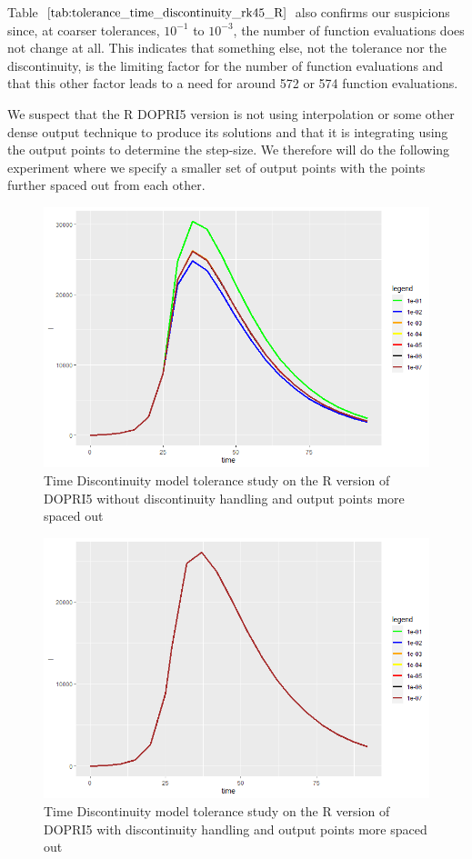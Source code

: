 Table $\ref{tab:tolerance_time_discontinuity_rk45_R}$ also confirms our suspicions since, at coarser tolerances, $10^{-1}$ to $10^{-3}$, the number of function evaluations does not change at all. This indicates that something else, not the tolerance nor the discontinuity, is the limiting factor for the number of function evaluations and that this other factor leads to a need for around 572 or 574 function evaluations.

We suspect that the R DOPRI5 version is not using interpolation or some other dense output technique to produce its solutions and that it is integrating using the output points to determine the step-size. We therefore will do the following experiment where we specify a smaller set of output points with the points further spaced out from each other.

\begin{figure}[H]
\centering
\includegraphics[width=0.7\linewidth]{./figures/tolerance_time_rk45_further_no_event_R}
\caption{Time Discontinuity model tolerance study on the R version of DOPRI5 without discontinuity handling and output points more spaced out}
\label{fig:tolerance_time_rk45_further_no_event_R}
\end{figure}

\begin{figure}[H]
\centering
\includegraphics[width=0.7\linewidth]{./figures/tolerance_time_rk45_further_with_event_R}
\caption{Time Discontinuity model tolerance study on the R version of DOPRI5 with discontinuity handling and output points more spaced out}
\label{fig:tolerance_time_rk45_further_with_event_R}
\end{figure}


